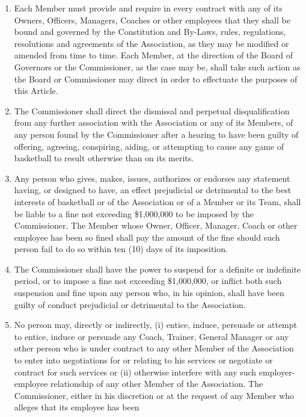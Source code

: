 \documentclass[]{book}
\theoremstyle{definition}
\theoremstyle{definition}
\theoremstyle{definition}
\theoremstyle{remark}
\begin{document}
\begin{enumerate}
\def\labelenumi{(\alph{enumi})}
\item
  Each Member must provide and require in every contract with any of its
  Owners, Officers, Managers, Coaches or other employees that they shall
  be bound and governed by the Constitution and By-Laws, rules,
  regulations, resolutions and agreements of the Association, as they
  may be modified or amended from time to time. Each Member, at the
  direction of the Board of Governors or the Commissioner, as the case
  may be, shall take such action as the Board or Commissioner may direct
  in order to effectuate the purposes of this Article.
\item
  The Commissioner shall direct the dismissal and perpetual
  disqualification from any further association with the Association or
  any of its Members, of any person found by the Commissioner after a
  hearing to have been guilty of offering, agreeing, conspiring, aiding,
  or attempting to cause any game of basketball to result otherwise than
  on its merits.
\item
  Any person who gives, makes, issues, authorizes or endorses any
  statement having, or designed to have, an effect prejudicial or
  detrimental to the best interests of basketball or of the Association
  or of a Member or its Team, shall be liable to a fine not exceeding
  \$1,000,000 to be imposed by the Commissioner. The Member whose Owner,
  Officer, Manager, Coach or other employee has been so fined shall pay
  the amount of the fine should such person fail to do so within ten
  (10) days of its imposition.
\item
  The Commissioner shall have the power to suspend for a definite or
  indefinite period, or to impose a fine not exceeding \$1,000,000, or
  inflict both such suspension and fine upon any person who, in his
  opinion, shall have been guilty of conduct prejudicial or detrimental
  to the Association.
\item
  No person may, directly or indirectly, (i) entice, induce, persuade or
  attempt to entice, induce or persuade any Coach, Trainer, General
  Manager or any other person who is under contract to any other Member
  of the Association to enter into negotiations for or relating to his
  services or negotiate or contract for such services or (ii) otherwise
  interfere with any such employer-employee relationship of any other
  Member of the Association. The Commissioner, either in his discretion
  or at the request of any Member who alleges that its employee has been

\end{enumerate}
\end{document}
